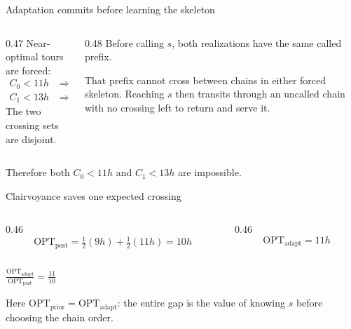 \documentclass[aspectratio=169,12pt]{beamer}
\newcommand{\OPT}{\mathrm{OPT}}
\newcommand{\optpost}{\OPT_{\mathrm{post}}}
\newcommand{\optadapt}{\OPT_{\mathrm{adapt}}}
\newcommand{\optprior}{\OPT_{\mathrm{prior}}}
\newcommand{\1}{\mathbf{1}}
\begin{document}
\begin{frame}{Adaptation commits before learning the skeleton}
  \begin{columns}[T,onlytextwidth]
    \begin{column}{0.47\textwidth}
      Near-optimal tours are forced:
      \[
      \begin{aligned}
        C_0<11h &\Longrightarrow \text{inactive skeleton }E_D,\\
        C_1<13h &\Longrightarrow \text{active skeleton }E_{\mathrm{all}}.
      \end{aligned}
      \]
      The two crossing sets are disjoint.
    \end{column}
    \begin{column}{0.48\textwidth}
      Before calling \(s\), both realizations have the same called prefix.

      \vspace{0.30cm}
      That prefix cannot cross between chains in either forced skeleton.
      Reaching \(s\) then transits through an uncalled chain with no crossing
      left to return and serve it.

      \vspace{0.28cm}
    \end{column}
  \end{columns}

  \vfill
  \centering
  Therefore both \(C_0<11h\) and \(C_1<13h\) are impossible.
\end{frame}

\begin{frame}{Clairvoyance saves one expected crossing}
  \vspace{0.22cm}
  \begin{columns}[c,onlytextwidth]
    \begin{column}{0.46\textwidth}
      \centering
      \[
        \optpost=\tfrac12(9h)+\tfrac12(11h)=10h
      \]
    \end{column}
    \begin{column}{0.46\textwidth}
      \centering
      \[
        \optadapt=11h
      \]
    \end{column}
  \end{columns}

  \vspace{0.10cm}
  \centering
  {\fontsize{31pt}{35pt}\selectfont\bfseries\color{STTeal}
    \(\displaystyle \frac{\optadapt}{\optpost}=\frac{11}{10}\)}

  \vspace{0.28cm}
  Here \(\optprior=\optadapt\): the entire gap is the value of knowing \(s\)
  before choosing the chain order.
\end{frame}
\end{document}
